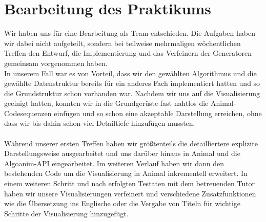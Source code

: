\documentclass[nochapname]{tudexercise}
\begin{document}
	\section{Bearbeitung des Praktikums}
		Wir haben uns für eine Bearbeitung als Team entschieden. Die Aufgaben haben wir dabei nicht aufgeteilt, sondern bei teilweise mehrmaligen wöchentlichen Treffen den Entwurf, die Implementierung und das Verfeinern der Generatoren gemeinsam vorgenommen haben.\\
		In unserem Fall war es von Vorteil, dass wir den gewählten Algorithmus und die gewählte Datenstruktur bereits für ein anderes Fach implementiert hatten und so die Grundstruktur schon vorhanden war. Nachdem wir uns auf die Visualisierung geeinigt hatten, konnten wir in die Grundgerüste fast nahtlos die Animal-Codesequenzen einfügen und so schon eine akzeptable Darstellung erreichen, ohne dass wir bis dahin schon viel Detailtiefe hinzufügen mussten.\\\\
		Während unserer ersten Treffen haben wir größtenteils die detailliertere explizite Darstellungsweise ausgearbeitet und uns darüber hinaus in Animal und die Algoanim-API eingearbeitet. Im weiteren Verlauf haben wir dann den bestehenden Code um die Visualisierung in Animal inkrementell erweitert. In einem weiteren Schritt und nach erfolgten Testaten mit dem betreuenden Tutor haben wir unsere Visualisierungen verfeinert und verschiedene Zusatzfunktionen wie die Übersetzung ins Englische oder die Vergabe von Titeln für wichtige Schritte der Visualisierung hinzugefügt.
		
\end{document}
